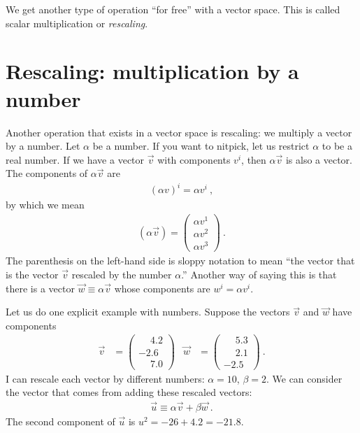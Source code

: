 \documentclass[12pt, oneside]{report}    %
\let\oldsection\section
\def\section{%
  \setcounter{sidenote}{1}%
  \oldsection
}
\begin{document}
We get another type of operation ``for free'' with a vector space. This is called scalar multiplication or \emph{rescaling}.



\section{Rescaling: multiplication by a number}

Another operation that exists in a vector space is rescaling: we multiply a vector by a number. 
Let $\alpha$ be a number. If you want to nitpick, let us restrict $\alpha$ to be a real number. If we have a vector $\vec{v}$ with components $v^i$, then $\alpha \vec{v}$ is also a vector. The components of $\alpha \vec{v}$ are
\begin{align}
    (\alpha v)^i = \alpha v^i \ ,
\end{align}
by which we mean
\begin{align}
    (\alpha\vec{v})
    =
    \begin{pmatrix}
        \alpha v^1 \\
        \alpha v^2 \\
        \alpha v^3 
    \end{pmatrix} \ .
\end{align}
The parenthesis on the left-hand side is sloppy notation to mean ``the vector that is the vector $\vec{v}$ rescaled by the number  $\alpha$.'' Another way of saying this is that there is a vector $\vec{w}\equiv \alpha\vec{v}$ whose components are $w^i = \alpha v^i$.

\begin{example}
Let us do one explicit example with numbers. Suppose the vectors $\vec{v}$ and $\vec{w}$ have components
\begin{align}
    \vec{v} &=
    \begin{pmatrix}
    \phantom{+}4.2\\
    -2.6\\
    \phantom{+}7.0        
    \end{pmatrix}
    &
    \vec{w} &=
    \begin{pmatrix}
    \phantom{+}5.3\\
    \phantom{+}2.1\\
    -2.5        
    \end{pmatrix} \ .
\end{align}
I can rescale each vector by different numbers: $\alpha = 10$, $\beta = 2$. We can consider the vector that comes from adding these rescaled vectors:
\begin{align}
    \vec{u} \equiv \alpha \vec{v} + \beta \vec{w} \ .
\end{align}
The second component of $\vec{u}$ is $u^2 = -26 + 4.2 = -21.8$.
\end{example}
\end{document}
